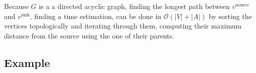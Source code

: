 Because $G$ is a a directed acyclic graph, finding the longest path
between $v^\text{source}$ and $v^\text{sink}$, \ie finding a time estimation,
can be done in $\mathcal{O}(|V|+|A|)$ by sorting the
vertices topologically and iterating through them, computing their maximum
distance from the source using the one of their parents.
\subsection{Example}

